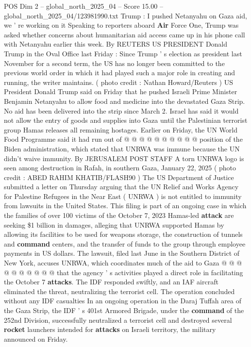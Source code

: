 \begin{textsample}{POS Dim 2 – global\_north\_2025\_04 – Score 15.00 – global\_north\_2025\_04/123981990.txt}  \label{ex:f2_pos_425}
Trump : I pushed Netanyahu on Gaza aid, we ' re working on it Speaking to reporters aboard \textbf{Air} Force One, Trump was asked whether concerns about humanitarian aid access came up in his phone call with Netanyahu earlier this week.
By REUTERS US PRESIDENT Donald Trump in the Oval Office last Friday : Since Trump ' s election as president last November for a second term, the US has no longer been committed to the previous world order in which it had played such a major role in creating and running, the writer maintains. ( photo credit : Nathan Howard/Reuters ) US President Donald Trump said on Friday that he pushed Israeli Prime Minister Benjamin Netanyahu to allow food and medicine into the devastated Gaza Strip.
No aid has been delivered into the strip since March 2.
Israel has said it would not allow the entry of goods and supplies into Gaza until the Palestinian terrorist group Hamas releases all remaining hostages.
Earlier on Friday, the UN World Food Programme said it had run out of @ @ @ @ @ @ @ @ @ @ position of the Biden administration, which stated that UNRWA was immune because the UN didn't waive immunity.
By JERUSALEM POST STAFF A torn UNRWA logo is seen among destruction in Rafah, in southern Gaza, January 22, 2025 ( photo credit : ABED RAHIM KHATIB/FLASH90 ) The US Department of Justice submitted a letter on Thursday arguing that the UN Relief and Works Agency for Palestine Refugees in the Near East ( UNRWA ) is not entitled to immunity from lawsuits in the United States.
This filing is part of an ongoing case in which the families of over 100 victims of the October 7, 2023 Hamas-led \textbf{attack} are seeking \$1 billion in damages, alleging that UNRWA supported Hamas by allowing its facilities to be used for weapons storage, the construction of tunnels and \textbf{command} centers, and the transfer of funds to the group through employee payments in US dollars.
The lawsuit, filed last June in the Southern District of New York, accuses UNRWA, which coordinates much of the aid to Gaza @ @ @ @ @ @ @ @ @ @ that the agency ' s activities played a direct role in facilitating the October 7 \textbf{attacks}.
The IDF responded swiftly, and an IAF aircraft eliminated the threat, neutralizing the terrorist cell.
The operation concluded without any IDF casualties In an ongoing operation in the Daraj Tuffah area of the Gaza Strip, the IDF ' s 401st Armored Brigade, under the \textbf{command} of the 252nd Division, successfully neutralized a terrorist cell and destroyed several \textbf{rocket} launchers intended for \textbf{attacks} on Israeli territory, the military announced on Friday.

\end{textsample}
